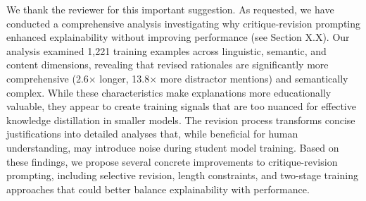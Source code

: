 We thank the reviewer for this important suggestion. As requested, we have conducted a comprehensive analysis investigating why critique-revision prompting enhanced explainability without improving performance (see Section X.X). Our analysis examined 1,221 training examples across linguistic, semantic, and content dimensions, revealing that revised rationales are significantly more comprehensive (2.6× longer, 13.8× more distractor mentions) and semantically complex. While these characteristics make explanations more educationally valuable, they appear to create training signals that are too nuanced for effective knowledge distillation in smaller models. The revision process transforms concise justifications into detailed analyses that, while beneficial for human understanding, may introduce noise during student model training. Based on these findings, we propose several concrete improvements to critique-revision prompting, including selective revision, length constraints, and two-stage training approaches that could better balance explainability with performance.